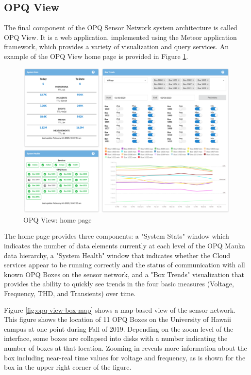 \subsection{OPQ View}
\label{sec:opq-view}

The final component of the OPQ Sensor Network system architecture is called OPQ View. It is a web application, implemented using the Meteor application framework, which provides a variety of visualization and query services.  An example of the OPQ View home page is provided in Figure \ref{fig:opq-view-home}.

\begin{figure}
\center \includegraphics[width=5in]{images/view/homepage.png}
\caption{OPQ View: home page}
\label{fig:opq-view-home}
\end{figure}

The home page provides three components:  a "System Stats" window which indicates the number of data elements currently at each level of the OPQ Mauka data hierarchy, a "System Health" window that indicates whether the Cloud services appear to be running correctly and the status of communication with all known OPQ Boxes on the sensor network, and a "Box Trends" visualization that provides the ability to quickly see trends in the four basic measures (Voltage, Frequency, THD, and Transients) over time.

Figure \ref{fig:opq-view-box-map} shows a map-based view of the sensor network. This figure shows the location of 11 OPQ Boxes on the University of Hawaii campus at one point during Fall of 2019. Depending on the zoom level of the interface, some boxes are collapsed into disks with a number indicating the number of boxes at that location. Zooming in reveals more information about the box including near-real time values for voltage and frequency, as is shown for the box in the upper right corner of the figure.

